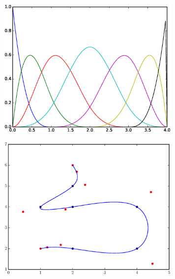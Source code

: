 \documentclass[10pt]{article}
\newenvironment{Figure}
  {\par\medskip\noindent\minipage{\linewidth}}
  {\endminipage\par\medskip}
\begin{document}
\begin{multicols*}{2}
  \begin{Figure}
    \includegraphics[width=9cm]{../spline_basis.eps}
     \label{fig:basis}
  \end{Figure}
  \begin{Figure}
    \includegraphics[width=9cm]{../s_img/spline8.eps}
     \label{fig:sample}
  \end{Figure}


\end{multicols*}
\end{document}

